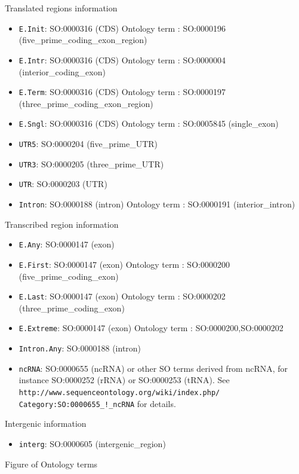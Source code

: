 Translated regions information
\begin{itemize}
\item \texttt{E.Init}: SO:0000316 (CDS) Ontology term :	SO:0000196 (five\_prime\_coding\_exon\_region)
\item \texttt{E.Intr}: SO:0000316 (CDS) Ontology term :	SO:0000004 (interior\_coding\_exon)
\item \texttt{E.Term}: SO:0000316 (CDS) Ontology term :	SO:0000197 (three\_prime\_coding\_exon\_region)
\item \texttt{E.Sngl}: SO:0000316 (CDS) Ontology term :	SO:0005845 (single\_exon)
\item \texttt{UTR5}:   SO:0000204 (five\_prime\_UTR)
\item \texttt{UTR3}:   SO:0000205 (three\_prime\_UTR)
\item \texttt{UTR}:    SO:0000203 (UTR)
\item \texttt{Intron}: SO:0000188 (intron) Ontology term : SO:0000191	(interior\_intron)
\end{itemize}

Transcribed region information
\begin{itemize}
\item \texttt{E.Any}: 		SO:0000147 (exon)
\item \texttt{E.First}: 	SO:0000147 (exon)	Ontology term :	SO:0000200 (five\_prime\_coding\_exon)
\item \texttt{E.Last}: 		SO:0000147 (exon)	Ontology term :	SO:0000202 (three\_prime\_coding\_exon)
\item \texttt{E.Extreme}: 	SO:0000147 (exon)	Ontology term :	SO:0000200,SO:0000202
\item \texttt{Intron.Any}: 	SO:0000188 (intron)
\item \texttt{ncRNA}: 	        SO:0000655 (ncRNA) or other SO terms derived from ncRNA, for instance SO:0000252 (rRNA) or SO:0000253 (tRNA). 
See  \texttt{http://www.sequenceontology.org/wiki/index.php/} \texttt{Category:SO:0000655\_!\_ncRNA} for details.

\end{itemize}

Intergenic information
\begin{itemize}
\item \texttt{interg}: SO:0000605 (intergenic_region)
\end{itemize}

Figure of Ontology terms


